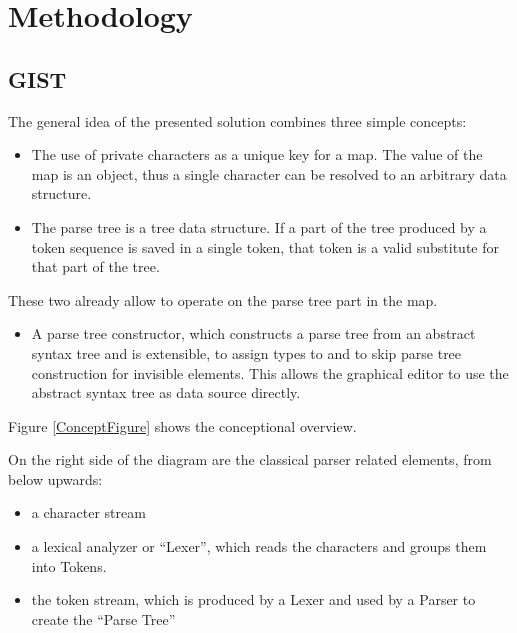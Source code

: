 \chapter{Methodology}



\section{GIST}
The general idea of the presented solution combines three simple concepts:
\begin{itemize}
	\item The use of private characters as a unique key for a map. The value of the map is an object, thus a single character can be resolved to an arbitrary data structure.
	\item The parse tree is a tree data structure. If a part of the tree produced by a token sequence is saved in a single token, that token is a valid substitute for that part of the tree.
\end{itemize}
These two already allow to operate on the parse tree part in the map.
\begin{itemize}
	\item A parse tree constructor, which constructs a parse tree from an abstract syntax tree and is extensible, to assign types to and to skip parse tree construction for invisible elements. This allows the graphical editor to use the abstract syntax tree as data source directly. 
\end{itemize}

Figure \ref{ConceptFigure} shows the conceptional overview. 

On the right side of the diagram are the classical parser related elements, from below upwards:
\begin{itemize}
	\item a character stream
	\item a lexical analyzer or ``Lexer'', which reads the characters and groups them into Tokens.
	\item the token stream, which is produced by a Lexer and used by a Parser to create the ``Parse Tree''
\end{itemize}

